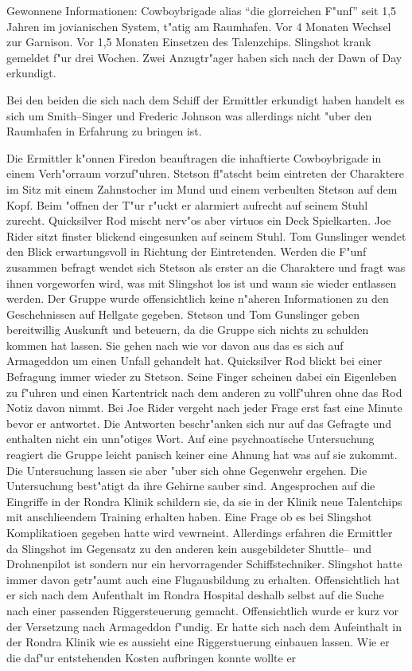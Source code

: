 \begin{remarks}
	Gewonnene Informationen: Cowboybrigade alias "`die glorreichen F"unf"' seit 1,5 Jahren im jovianischen System, t"atig am Raumhafen. Vor 4 Monaten Wechsel zur Garnison. Vor 1,5 Monaten Einsetzen des Talenzchips. Slingshot krank gemeldet f"ur drei Wochen. Zwei Anzugtr"ager haben sich nach der Dawn of Day erkundigt.

	Bei den beiden die sich nach dem Schiff der Ermittler erkundigt haben handelt es sich um Smith--Singer und Frederic Johnson was allerdings nicht "uber den Raumhafen in Erfahrung zu bringen ist.
\end{remarks}



Die Ermittler k"onnen Firedon beauftragen die inhaftierte Cowboybrigade in einem Verh"orraum vorzuf"uhren. Stetson fl"atscht beim eintreten der Charaktere im Sitz mit einem Zahnstocher im Mund und einem verbeulten Stetson auf dem Kopf. Beim "offnen der T"ur r"uckt er alarmiert aufrecht auf seinem Stuhl zurecht. Quicksilver Rod mischt nerv"os aber virtuos ein Deck Spielkarten. Joe Rider sitzt finster blickend eingesunken auf seinem Stuhl. Tom Gunslinger wendet den Blick erwartungsvoll in Richtung der Eintretenden. Werden die F"unf zusammen befragt wendet sich Stetson als erster an die Charaktere und fragt was ihnen vorgeworfen wird, was mit Slingshot los ist und wann sie wieder entlassen werden. Der Gruppe wurde offensichtlich keine n"aheren Informationen zu den Geschehnissen auf Hellgate gegeben. Stetson und Tom Gunslinger geben bereitwillig Auskunft und beteuern, da\3 die Gruppe sich nichts zu schulden kommen hat lassen. Sie gehen nach wie vor davon aus das es sich auf Armageddon um einen Unfall gehandelt hat. Quicksilver Rod blickt bei einer Befragung immer wieder zu Stetson. Seine Finger scheinen dabei ein Eigenleben zu f"uhren und einen Kartentrick nach dem anderen zu vollf"uhren ohne das Rod Notiz davon nimmt. Bei Joe Rider vergeht nach jeder Frage erst fast eine Minute bevor er antwortet. Die Antworten beschr"anken sich nur auf das Gefragte und enthalten nicht ein unn"otiges Wort. Auf eine psychnoatische Untersuchung reagiert die Gruppe leicht panisch keiner eine Ahnung hat was auf sie zukommt. Die Untersuchung lassen sie aber "uber sich ohne Gegenwehr ergehen. Die Untersuchung best"atigt da\3 ihre Gehirne sauber sind. Angesprochen auf die Eingriffe in der Rondra Klinik schildern sie, da\3 sie in der Klinik neue Talentchips mit anschlie\3endem Training erhalten haben. Eine Frage ob es bei Slingshot Komplikatioen gegeben hatte wird vewrneint. Allerdings erfahren die Ermittler da\3 Slingshot im Gegensatz zu den anderen kein ausgebildeter Shuttle-- und Drohnenpilot ist sondern nur ein hervorragender Schiffstechniker. Slingshot hatte immer davon getr"aumt auch eine Flugausbildung zu erhalten. Offensichtlich hat er sich nach dem Aufenthalt im Rondra Hospital deshalb selbst auf die Suche nach einer passenden Riggersteuerung gemacht. Offensichtlich wurde er kurz vor der Versetzung nach Armageddon f"undig. Er hatte sich nach dem Aufeinthalt in der Rondra Klinik wie es aussieht eine Riggerstuerung einbauen lassen. Wie er die daf"ur entstehenden Kosten aufbringen konnte wollte er 